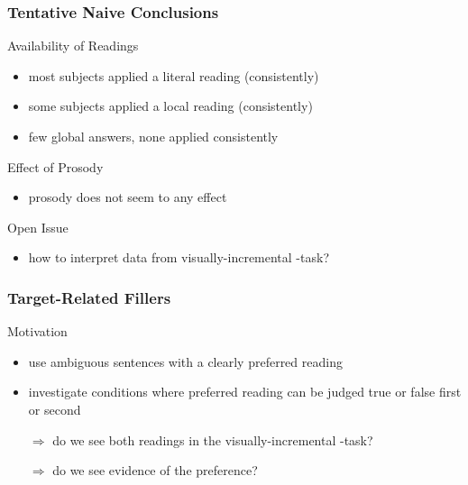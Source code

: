 \documentclass[fleqn,10pt,serif,xcolor=dvipsnames]{beamer}
\begin{document}
\begin{frame}
  \frametitle{Tentative Naive Conclusions}
  
  \begin{block}{Availability of Readings}
    \begin{itemize}
    \item most subjects applied a literal reading (consistently)
    \item some subjects applied a local reading (consistently)
    \item few global answers, none applied consistently
    \end{itemize}
  \end{block}

  \begin{block}{Effect of Prosody}
    \begin{itemize}
    \item prosody does not seem to any effect
    \end{itemize}
  \end{block}

  \begin{block}{Open Issue}
    \begin{itemize}
    \item how to interpret data from visually-incremental
      -task?
    \end{itemize}

  \end{block}
\end{frame}

\begin{frame}
  \frametitle{Target-Related Fillers}
  \begin{block}{Motivation}
    \begin{itemize}
    \item use ambiguous sentences with a clearly preferred reading
    \item investigate conditions where preferred reading can be judged
      true or false first or second
    \item[$\Rightarrow$] do we see both readings in the visually-incremental
      -task?
    \item[$\Rightarrow$] do we see evidence of the preference?
    \end{itemize}
  \end{block}
\end{frame}
\end{document}
